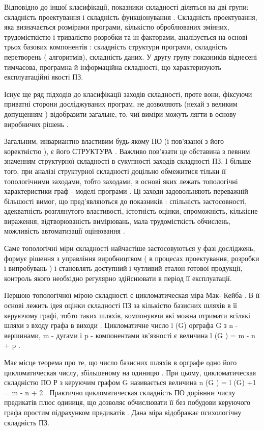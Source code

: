 Відповідно до іншої класифікації, показники складності діляться на дві групи: складність проектування і складність функціонування . Складність проектування, яка визначається розмірами програми, кількістю оброблюваних змінних, трудомісткістю і тривалістю розробки та ін факторами, аналізується на основі трьох базових компонентів : складність структури програми, складність перетворень ( алгоритмів), складність даних. У другу групу показників віднесені тимчасова, програмна й інформаційна складності, що характеризують експлуатаційні якості ПЗ.

Існує ще ряд підходів до класифікації заходів складності, проте вони, фіксуючи приватні сторони досліджуваних програм, не дозволяють (нехай з великим допущенням ) відобразити загальне, то, чиї виміри можуть лягти в основу виробничих рішень .

Загальним, инвариантно властивим будь-якому ПО (і пов'язаної з його коректністю ), є його СТРУКТУРА . Важливо пов'язати це обставина з певним значенням структурної складності в сукупності заходів складності ПЗ. І більше того, при аналізі структурної складності доцільно обмежитися тільки її топологічними заходами, тобто заходами, в основі яких лежать топологічні характеристики граф - моделі програми . Ці заходи задовольняють переважній більшості вимог, що пред'являються до показників : спільність застосовності, адекватність розглянутого властивості, істотність оцінки, спроможність, кількісне вираження, відтворюваність вимірювань, мала трудомісткість обчислень, можливість автоматизації оцінювання .

Саме топологічні міри складності найчастіше застосовуються у фазі досліджень, формує рішення з управління виробництвом ( в процесах проектування, розробки і випробувань ) і становлять доступний і чутливий еталон готової продукції, контроль якого необхідно регулярно здійснювати в період її експлуатації.

Першою топологічної мірою складності є цикломатическая міра Мак- Кейба . В її основі лежить ідея оцінки складності ПЗ за кількістю базисних шляхів в її керуючому графі, тобто таких шляхів, компонуючи які можна отримати всілякі шляхи з входу графа в виходи . Цикломатичне число l (G) орграфа G з n - вершинами, m - дугами і p - компонентами зв'язності є величина l (G ) = m - n + p .

Має місце теорема про те, що число базисних шляхів в орграфе одно його цикломатическая числу, збільшеному на одиницю . При цьому, цикломатическая складністю ПО Р з керуючим графом G називається величина n (G ) = l (G) +1 = m - n + 2 . Практично цикломатическая складність ПО дорівнює числу предикатів плюс одиниця, що дозволяє обчислювати її без побудови керуючого графа простим підрахунком предикатів . Дана міра відображає психологічну складність ПЗ.

